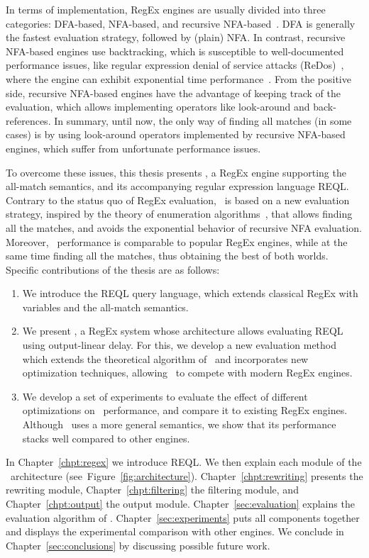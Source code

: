 In terms of implementation, RegEx engines are usually divided into three categories: DFA-based, NFA-based, and recursive NFA-based~\cite{cox2007regular}. DFA is generally the fastest evaluation strategy, followed by (plain) NFA. In contrast, recursive NFA-based engines use backtracking, which is susceptible to well-documented performance issues, like regular expression denial of service attacks (ReDos)~\cite{friedl2006mastering}, where the engine can exhibit exponential time performance~\cite{cox2007regular}. From the positive side, recursive NFA-based engines have the advantage of keeping track of the evaluation, which allows implementing operators like look-around and back-references.
In summary, until now, the only way of finding all matches (in some cases) is by using look-around operators implemented by recursive NFA-based engines, which suffer from unfortunate performance issues. 

To overcome these issues, this thesis presents \rematch, a RegEx engine supporting the all-match semantics, and its accompanying regular expression language REQL. Contrary to the status quo of RegEx evaluation, \rematch\ is based on a new evaluation strategy, inspired by the theory of enumeration algorithms~\cite{Segoufin13}, that allows finding all the matches, and avoids the exponential behavior of recursive NFA evaluation. Moreover, \rematch\ performance is comparable to popular RegEx engines, while at the same time finding all the matches, thus obtaining the best of both worlds. Specific contributions of the thesis are as follows:

\begin{enumerate}

\item  We introduce the REQL query language, which extends classical RegEx with variables and the all-match semantics.	

\item We present \rematch, a RegEx system whose architecture allows evaluating REQL using output-linear delay. For this, we develop a new evaluation method which extends the theoretical algorithm of~\cite{FlorenzanoRUVV20} and incorporates new optimization techniques, allowing \rematch\ to compete with modern RegEx engines. 

\item We develop a set of experiments to evaluate the effect of different optimizations on \rematch\ performance, and compare it to existing RegEx engines. Although \rematch\ uses a more general semantics, we show that its performance stacks well compared to other engines.
	
\end{enumerate}

In Chapter~\ref{chpt:regex} we introduce REQL. We then explain each module of the \rematch\ architecture (see~Figure~\ref{fig:architecture}). Chapter~\ref{chpt:rewriting} presents the rewriting module, Chapter~\ref{chpt:filtering} the filtering module, and Chapter~\ref{chpt:output} the output module. Chapter~\ref{sec:evaluation} explains the evaluation algorithm of \rematch. Chapter~\ref{sec:experiments} puts all components together and displays the experimental comparison with other engines. We conclude in Chapter~\ref{sec:conclusions} by discussing possible future work. 
